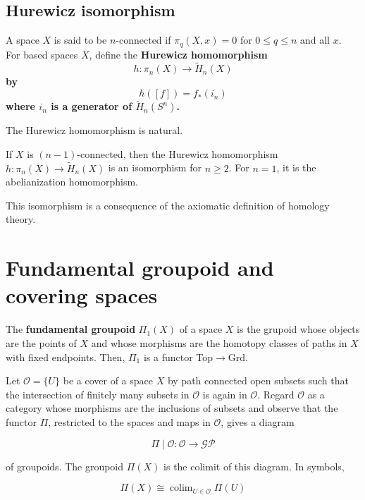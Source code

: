 
\subsection*{Hurewicz isomorphism}
A space $X$ is said to be $n$-connected if $\pi_q(X, x)=0$ for $0 \leq q \leq n$ and all $x$.\\

For based spaces $X$, define the \bf{Hurewicz homomorphism}
$$
h: \pi_n(X) \longrightarrow \tilde{H}_n(X)
$$
by
$$
h([f])=f_*\left(i_n\right)
$$
where $i_n$ is a generator of $\tilde{H}_n(S^n)$.

\begin{prop}
    The Hurewicz homomorphism is natural.
\end{prop}

\begin{theo}
    If $X$ is $(n-1)$-connected, then the Hurewicz homomorphism $h: \pi_n(X) \longrightarrow \tilde{H}_n(X)$ is an isomorphism for $n \geq 2$. For $n=1$, it is the abelianization homomorphism.
\end{theo}

This isomorphism is a consequence of the axiomatic definition of homology theory.



\section{Fundamental groupoid and covering spaces}




The \textbf{fundamental groupoid} $\Pi_1(X)$ of a space $X$ is the grupoid whose objects are the points of $X$ and whose morphisms are the homotopy classes of paths in $X$ with fixed endpoints. Then, $\Pi_1$ is a functor Top$\rightarrow$Grd.\\

\begin{theo}
Let $\mathscr{O}=\{U\}$ be a cover of a space $X$ by path connected open subsets such that the intersection of finitely many subsets in $\mathscr{O}$ is again in $\mathscr{O}$. Regard $\mathscr{O}$ as a category whose morphisms are the inclusions of subsets and observe that the functor $\Pi$, restricted to the spaces and maps in $\mathscr{O}$, gives a diagram

$$
\Pi \mid \mathscr{O}: \mathscr{O} \longrightarrow \mathscr{G} \mathscr{P}
$$

of groupoids. The groupoid $\Pi(X)$ is the colimit of this diagram. In symbols,

$$
\Pi(X) \cong \operatorname{colim}_{U \in \mathscr{O}} \Pi(U)
$$

\end{theo}


